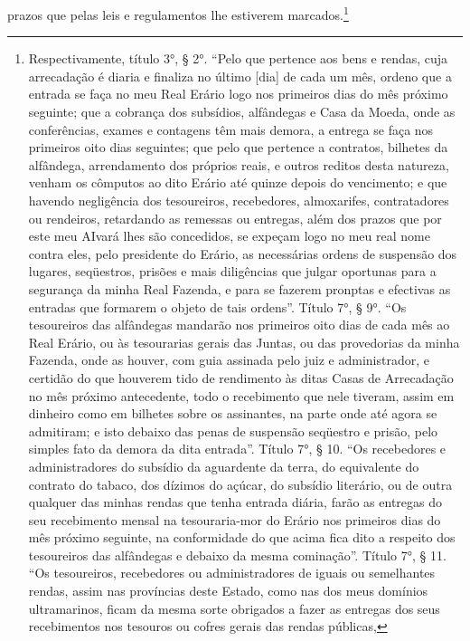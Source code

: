 prazos que pelas leis e regulamentos lhe estiverem marcados.\footnote{Respectivamente,
  título 3°, § 2°. ``Pelo que pertence aos bens e rendas, cuja
  arrecadação é diaria e finaliza no último {[}dia{]} de cada um mês,
  ordeno que a entrada se faça no meu Real Erário logo nos primeiros
  dias do mês próximo seguinte; que a cobrança dos subsídios, alfândegas
  e Casa da Moeda, onde as conferências, exames e contagens têm mais
  demora, a entrega se faça nos primeiros oito dias seguintes; que pelo
  que pertence a contratos, bilhetes da alfândega, arrendamento dos
  próprios reais, e outros reditos desta natureza, venham os cômputos ao
  dito Erário até quinze depois do vencimento; e que havendo negligência
  dos tesoureiros, recebedores, almoxarifes, contratadores ou rendeiros,
  retardando as remessas ou entregas, além dos prazos que por este meu
  AIvará lhes são concedidos, se expeçam logo no meu real nome contra
  eles, pelo presidente do Erário, as necessárias ordens de suspensão
  dos lugares, seqüestros, prisões e mais diligências que julgar
  oportunas para a segurança da minha Real Fazenda, e para se fazerem
  pronptas e efectivas as entradas que formarem o objeto de tais
  ordens''. Título 7°, § 9°. ``Os tesoureiros das alfândegas mandarão
  nos primeiros oito dias de cada mês ao Real Erário, ou às tesourarias
  gerais das Juntas, ou das provedorias da minha Fazenda, onde as
  houver, com guia assinada pelo juiz e administrador, e certidão do que
  houverem tido de rendimento às ditas Casas de Arrecadação no mês
  próximo antecedente, todo o recebimento que nele tiveram, assim em
  dinheiro como em bilhetes sobre os assinantes, na parte onde até agora
  se admitiram; e isto debaixo das penas de suspensão seqüestro e
  prisão, pelo simples fato da demora da dita entrada''. Título 7°, §
  10. ``Os recebedores e administradores do subsídio da aguardente da
  terra, do equivalente do contrato do tabaco, dos dízimos do açúcar, do
  subsídio literário, ou de outra qualquer das minhas rendas que tenha
  entrada diária, farão as entregas do seu recebimento mensal na
  tesouraria-mor do Erário nos primeiros dias do mês próximo seguinte,
  na conformidade do que acima fica dito a respeito dos tesoureiros das
  alfândegas e debaixo da mesma cominação''. Título 7°, § 11. ``Os
  tesoureiros, recebedores ou administradores de iguais ou semelhantes
  rendas, assim nas províncias deste Estado, como nas dos meus domínios
  ultramarinos, ficam da mesma sorte obrigados a fazer as entregas dos
  seus recebimentos nos tesouros ou cofres gerais das rendas públicas,
}
